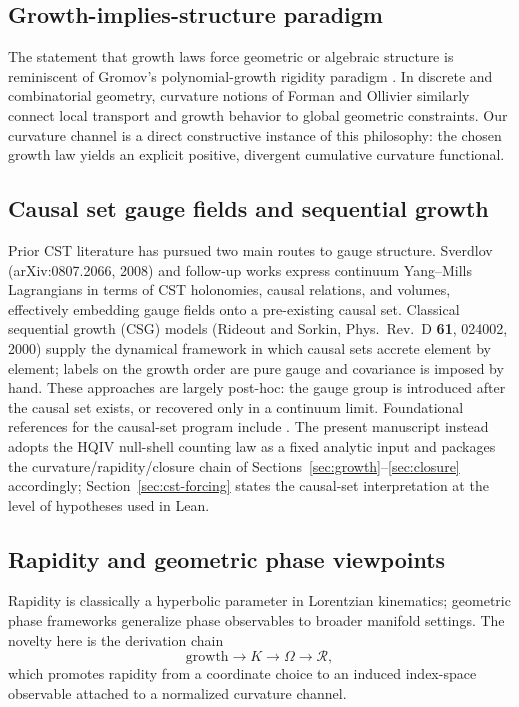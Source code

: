 \documentclass[11pt]{amsart}
\begin{document}
\subsection*{Growth-implies-structure paradigm}
The statement that growth laws force geometric or algebraic structure is reminiscent of Gromov's polynomial-growth rigidity paradigm \cite{gromov1981}. In discrete and combinatorial geometry, curvature notions of Forman and Ollivier \cite{forman2003,ollivier2009} similarly connect local transport and growth behavior to global geometric constraints. Our curvature channel is a direct constructive instance of this philosophy: the chosen growth law yields an explicit positive, divergent cumulative curvature functional.

\subsection*{Causal set gauge fields and sequential growth}
Prior CST literature has pursued two main routes to gauge structure. Sverdlov (arXiv:0807.2066, 2008) and follow-up works express continuum Yang--Mills Lagrangians in terms of CST holonomies, causal relations, and volumes, effectively embedding gauge fields onto a pre-existing causal set. Classical sequential growth (CSG) models (Rideout and Sorkin, Phys.\ Rev.\ D \textbf{61}, 024002, 2000) supply the dynamical framework in which causal sets accrete element by element; labels on the growth order are pure gauge and covariance is imposed by hand. These approaches are largely post-hoc: the gauge group is introduced after the causal set exists, or recovered only in a continuum limit. Foundational references for the causal-set program include \cite{bombelli1987,sorkin2005}. The present manuscript instead adopts the HQIV null-shell counting law as a fixed analytic input and packages the curvature/rapidity/closure chain of Sections~\ref{sec:growth}--\ref{sec:closure} accordingly; Section~\ref{sec:cst-forcing} states the causal-set interpretation at the level of hypotheses used in Lean.

\subsection*{Rapidity and geometric phase viewpoints}
Rapidity is classically a hyperbolic parameter in Lorentzian kinematics; geometric phase frameworks generalize phase observables to broader manifold settings. The novelty here is the derivation chain
\[
\text{growth}\to K\to \Omega\to \mathcal R,
\]
which promotes rapidity from a coordinate choice to an induced index-space observable attached to a normalized curvature channel.
\end{document}
